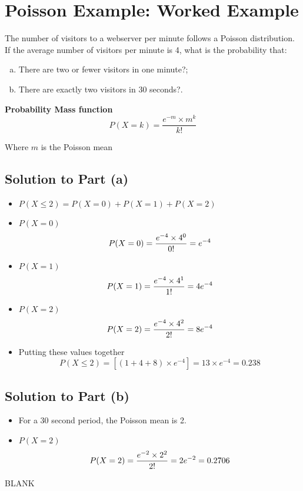 \documentclass[a4paper,12pt]{article}
\begin{document}
\large 


\section*{Poisson Example: Worked Example}

The number of visitors to a webserver per minute follows a Poisson
distribution. If the average number of visitors per minute is 4,
what is the probability that:
\begin{enumerate}[(a)]
	\item  There are two or fewer visitors in one minute?;
	\item  There are exactly two visitors in 30 seconds?.
\end{enumerate}

\begin{framed}
\noindent \textbf{Probability Mass function}\\
\[P(X = k) = \frac{ e^{-m} \times m^k}{ k!} \]

\noindent Where $m$ is the Poisson mean
\end{framed}




\subsection*{Solution to Part (a)}
\begin{itemize}
	\item  $P(X\leq 2) = P(X = 0) + P(X = 1) + P(X = 2)$ \medskip 
	\item  $P(X = 0)$
	\[P(X = 0) = { e^{-4} \times 4^0\over 0!} = e^{-4}\]
	\item  $P(X = 1)$
	\[P(X = 1) = { e^{-4} \times 4^1\over 1!} = 4e^{-4}\]
	\item  $P(X = 2)$
	\[P(X = 2) = { e^{-4} \times 4^2\over 2!} = 8e^{-4}\]
	\item  Putting these values together
	\[P(X\leq 2) = \left[(1+4+8) \times e^{-4}\right] = 13 \times e^{-4} = 0.238\]
\end{itemize}
\subsection*{Solution to Part (b)}
\begin{itemize}
    \item  For a 30 second period, the Poisson mean is 2.
   \item  $P(X = 2)$
	\[P(X = 2) = { e^{-2} \times 2^2\over 2!} = 2e^{-2} = 0.2706\]
 
\end{itemize}

\newpage

BLANK
\end{document}
